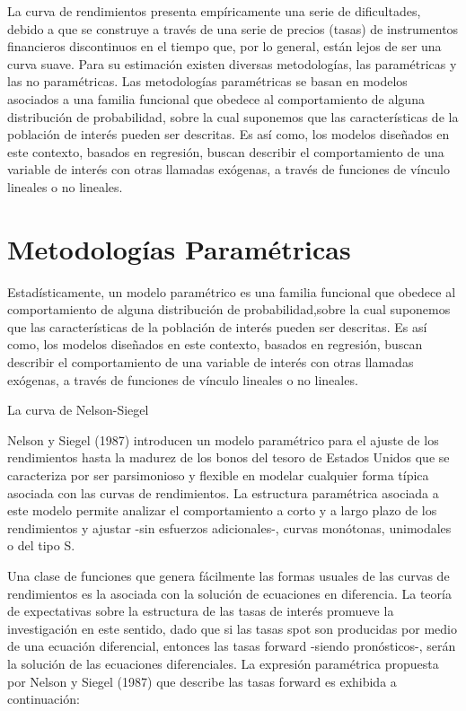 \vspace{0.5cm}

\hspace*{0.4 cm} La curva de rendimientos presenta emp\'iricamente una serie de dificultades, debido a que se construye a trav\'es de una serie de precios (tasas) de instrumentos financieros discontinuos en el tiempo que, por lo general, est\'an lejos de ser una curva suave. Para su estimaci\'on existen diversas metodolog\'ias, las param\'etricas y las no param\'etricas. Las metodolog\'ias param\'etricas se basan en modelos asociados a una familia funcional que obedece al comportamiento de alguna distribuci\'on de probabilidad, sobre la cual suponemos que las caracter\'isticas de la poblaci\'on de inter\'es pueden ser descritas. Es as\'i como, los modelos dise\~nados en este contexto, basados en regresi\'on, buscan describir el comportamiento de una variable de inter\'es con otras llamadas ex\'ogenas, a trav\'es de funciones de v\'inculo lineales o no lineales.


\section{Metodolog\'ias Param\'etricas}

\hspace*{0.4 cm} Estad\'isticamente, un modelo param\'etrico es una familia funcional que
obedece al comportamiento de alguna distribuci\'on de probabilidad,sobre la cual suponemos que las caracter\'isticas de la poblaci\'on de inter\'es
pueden ser descritas. Es as\'i como, los modelos dise\~nados en este contexto,
basados en regresi\'on, buscan describir el comportamiento de una
variable de inter\'es con otras llamadas ex\'ogenas, a trav\'es de funciones de
v\'inculo lineales o no lineales.

La curva de Nelson-Siegel

\hspace*{0.4 cm} Nelson y Siegel (1987) introducen un modelo param\'etrico para el ajuste
de los rendimientos hasta la madurez de los bonos del tesoro de Estados
Unidos que se caracteriza por ser parsimonioso y flexible en modelar
cualquier forma t\'ipica asociada con las curvas de rendimientos. La estructura
param\'etrica asociada a este modelo permite analizar el comportamiento
a corto y a largo plazo de los rendimientos y ajustar -sin
esfuerzos adicionales-, curvas mon\'otonas, unimodales o del tipo S.


\hspace*{0.4 cm} Una clase de funciones que genera f\'acilmente las formas usuales de las
curvas de rendimientos es la asociada con la soluci\'on de ecuaciones en
diferencia. La teor\'ia de expectativas sobre la estructura de las tasas de
inter\'es promueve la investigaci\'on en este sentido, dado que si las tasas
spot son producidas por medio de una ecuaci\'on diferencial, entonces las
tasas forward -siendo pron\'osticos-, ser\'an la soluci\'on de las ecuaciones
diferenciales. La expresi\'on param\'etrica propuesta por Nelson y Siegel
(1987) que describe las tasas forward es exhibida a continuaci\'on:


